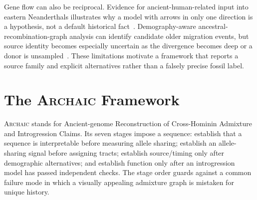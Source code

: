 \documentclass[conference]{IEEEtran}
\newcommand{\archaic}{\textsc{Archaic}}
\begin{document}
Gene flow can also be reciprocal. Evidence for ancient-human-related input into eastern Neanderthals illustrates why a model with arrows in only one direction is a hypothesis, not a default historical fact~\cite{kuhlwilm2016}. Demography-aware ancestral-recombination-graph analysis can identify candidate older migration events, but source identity becomes especially uncertain as the divergence becomes deep or a donor is unsampled~\cite{hubisz2020,schaefer2021}. These limitations motivate a framework that reports a source family and explicit alternatives rather than a falsely precise fossil label.

\section{The \archaic{} Framework}

\archaic{} stands for Ancient-genome Reconstruction of Cross-Hominin Admixture and Introgression Claims. Its seven stages impose a sequence: establish that a sequence is interpretable before measuring allele sharing; establish an allele-sharing signal before assigning tracts; establish source/timing only after demographic alternatives; and establish function only after an introgression model has passed independent checks. The stage order guards against a common failure mode in which a visually appealing admixture graph is mistaken for unique history.
\end{document}
